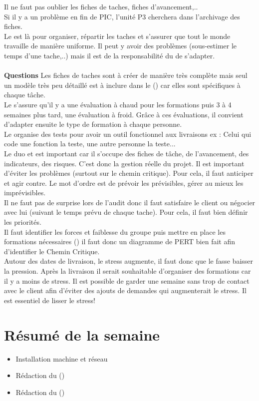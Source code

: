 \documentclass [a4paper] {article}
\begin{document}
Il ne faut pas oublier les fiches de taches, fiches d'avancement,.. \\
Si il y a un problème en fin de PIC, l'unité P3 cherchera dans l'archivage des fiches. 
\\
Le \CPCourt est là pour organiser, répartir les taches et s'assurer que tout le monde travaille de manière uniforme. Il peut y avoir des problèmes (sous-estimer le temps d'une tache,..) mais il est de la responsabilité du \CPCourt de s'adapter.
\\
~~\\
\textbf{Questions}
Les fiches de taches sont à créer de manière très complète mais seul un modèle très peu détaillé est à inclure dans le \PQ (\PQCourt) car elles sont spécifiques à chaque tâche.
\\
Le \RQCourt s'assure qu'il y a une évaluation à chaud pour les formations puis 3 à 4 semaines plus tard, une évaluation à froid. Grâce à ces évaluations, il convient d'adapter ensuite le type de formation à chaque personne.
\\
Le \RD organise des tests pour avoir un outil fonctionnel aux livraisons
ex : Celui qui code une fonction la teste, une autre personne la teste...
\\
Le duo \CPCourt et \RQCourt est important car il s'occupe des fiches de tâche, de l'avancement, des indicateurs, des risques. C'est donc la gestion réelle du projet. Il est important d'éviter les problèmes (surtout sur le chemin critique). Pour cela, il faut anticiper et agir contre. Le mot d'ordre est de prévoir les prévisibles, gérer au mieux les imprévisibles.
\\
Il ne faut pas de surprise lors de l'audit donc il faut satisfaire le client ou négocier avec lui (suivant le temps prévu de chaque tache). Pour cela, il faut bien définir les priorités.
\\
Il faut identifier les forces et faiblesse du groupe puis mettre en place les formations nécessaires (\RQCourt) il faut donc un diagramme de PERT bien fait afin d'identifier le Chemin Critique.
\\
Autour des dates de livraison, le stress augmente, il faut donc que le \CPCourt fasse baisser la pression. Après la livraison il serait souhaitable d'organiser des formations car il y a moins de stress. Il est possible de garder une semaine sans trop de contact avec le client afin d'éviter des ajouts de demandes qui augmenterait le stress.
Il est essentiel de lisser le stress!

\section{Résumé de la semaine}
\begin{itemize}
\item Installation machine et réseau
\item Rédaction du \PQ (\PQCourt)
\item Rédaction du \PGC (\PGCCourt)
\end{itemize}
\end{document}
